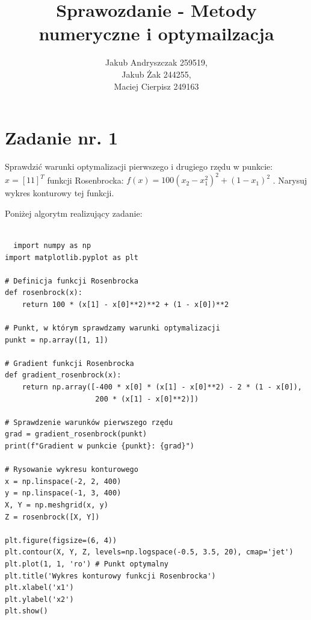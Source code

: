 \documentclass{article}
\begin{document}
\title{Sprawozdanie - Metody numeryczne i optymailzacja}
\author{Jakub Andryszczak 259519,\\ Jakub Żak 244255,\\ Maciej Cierpisz 249163}
\date{}
\maketitle

\newpage
\tableofcontents

\newpage
\section{Zadanie nr. 1}

Sprawdzić warunki optymalizacji pierwszego i drugiego rzędu w punkcie: $ x = [1  1]^T $
funkcji Rosenbrocka: $f(x) = 100(x_2 - x_1^2)^2 + (1-x_1)^2 $ . Narysuj wykres 
konturowy tej funkcji.

Poniżej algorytm realizujący zadanie:

\begin{lstlisting}

  import numpy as np
import matplotlib.pyplot as plt

# Definicja funkcji Rosenbrocka
def rosenbrock(x):
    return 100 * (x[1] - x[0]**2)**2 + (1 - x[0])**2

# Punkt, w którym sprawdzamy warunki optymalizacji
punkt = np.array([1, 1])

# Gradient funkcji Rosenbrocka
def gradient_rosenbrock(x):
    return np.array([-400 * x[0] * (x[1] - x[0]**2) - 2 * (1 - x[0]), 
                     200 * (x[1] - x[0]**2)])

# Sprawdzenie warunków pierwszego rzędu
grad = gradient_rosenbrock(punkt)
print(f"Gradient w punkcie {punkt}: {grad}")

# Rysowanie wykresu konturowego
x = np.linspace(-2, 2, 400)
y = np.linspace(-1, 3, 400)
X, Y = np.meshgrid(x, y)
Z = rosenbrock([X, Y])

plt.figure(figsize=(6, 4))
plt.contour(X, Y, Z, levels=np.logspace(-0.5, 3.5, 20), cmap='jet')
plt.plot(1, 1, 'ro') # Punkt optymalny
plt.title('Wykres konturowy funkcji Rosenbrocka')
plt.xlabel('x1')
plt.ylabel('x2')
plt.show()

\end{lstlisting}

\newpage
\end{document}
